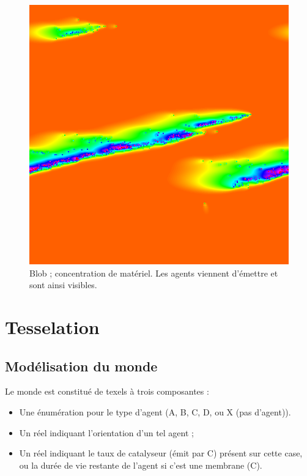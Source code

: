 \documentclass[11pt]{scrartcl}
\begin{document}
            \begin{figure}[h]
                \centering
                \includegraphics[width=\textwidth]{physarum_hsv}
                \caption{Blob ; concentration de matériel. Les agents viennent d'émettre et sont ainsi visibles.}\label{fig:phy-hsv}
            \end{figure}
    
    \section{Tesselation}
        \subsection{Modélisation du monde}
            Le monde est constitué de texels à trois composantes :
            \begin{itemize}
                \item Une énumération pour le type d'agent (A, B, C, D, ou X (pas d'agent)).
                \item Un réel indiquant l'orientation d'un tel agent ;
                \item Un réel indiquant le taux de catalyseur (émit par C) présent sur cette case,
                      ou la durée de vie restante de l'agent si c'est une membrane (C).
            \end{itemize}
            
\end{document}
